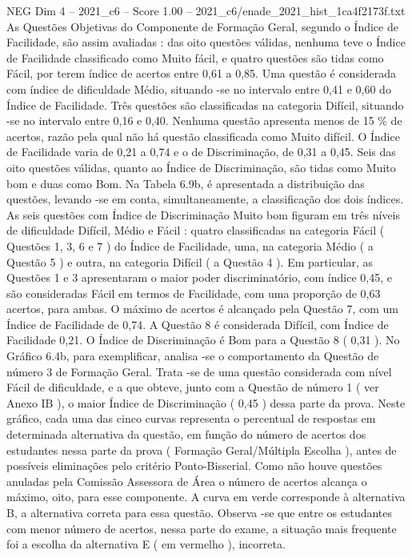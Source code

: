 \begin{textsample}{NEG Dim 4 – 2021\_c6 – Score 1.00 – 2021\_c6/enade\_2021\_hist\_1ca4f2173f.txt}
As Questões Objetivas do Componente de Formação Geral, segundo o Índice de Facilidade, são assim avaliadas : das oito questões válidas, nenhuma teve o Índice de Facilidade classificado como Muito fácil, e quatro questões são tidas como Fácil, por terem índice de acertos entre 0,61 a 0,85.
Uma questão é considerada com índice de dificuldade Médio, situando -se no intervalo entre 0,41 e 0,60 do Índice de Facilidade.
Três questões são classificadas na categoria Difícil, situando -se no intervalo entre 0,16 e 0,40.
Nenhuma questão apresenta menos de 15 \% de acertos, razão pela qual não há questão classificada como Muito difícil.
O Índice de Facilidade varia de 0,21 a 0,74 e o de Discriminação, de 0,31 a 0,45.
Seis das oito questões válidas, quanto ao Índice de Discriminação, são tidas como Muito bom e duas como Bom.
Na Tabela 6.9b, é apresentada a distribuição das questões, levando -se em conta, simultaneamente, a classificação dos dois índices.
As seis questões com Índice de Discriminação Muito bom figuram em três níveis de dificuldade Difícil, Médio e Fácil : quatro classificadas na categoria Fácil ( Questões 1, 3, 6 e 7 ) do Índice de Facilidade, uma, na categoria Médio ( a Questão 5 ) e outra, na categoria Difícil ( a Questão 4 ).
Em particular, as Questões 1 e 3 apresentaram o maior poder discriminatório, com índice 0,45, e são consideradas Fácil em termos de Facilidade, com uma proporção de 0,63 acertos, para ambas.
O máximo de acertos é alcançado pela Questão 7, com um Índice de Facilidade de 0,74.
A Questão 8 é considerada Difícil, com Índice de Facilidade 0,21.
O Índice de Discriminação é Bom para a Questão 8 ( 0,31 ).
No Gráfico 6.4b, para exemplificar, analisa -se o comportamento da Questão de número 3 de Formação Geral.
Trata -se de uma questão considerada com nível Fácil de dificuldade, e a que obteve, junto com a Questão de número 1 ( ver Anexo IB ), o maior Índice de Discriminação ( 0,45 ) dessa parte da prova.
Neste gráfico, cada uma das cinco curvas representa o percentual de respostas em determinada alternativa da questão, em função do número de acertos dos estudantes nessa parte da prova ( Formação Geral/Múltipla Escolha ), antes de possíveis eliminações pelo critério Ponto-Bisserial.
Como não houve questões anuladas pela Comissão Assessora de Área o número de acertos alcança o máximo, oito, para esse componente.
A curva em verde corresponde à alternativa B, a alternativa correta para essa questão.
Observa -se que entre os estudantes com menor número de acertos, nessa parte do exame, a situação mais frequente foi a escolha da alternativa E ( em vermelho ), incorreta.

\end{textsample}
